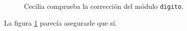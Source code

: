 \begin{figure}[ht]
  \renewcommand{\thesubfigure}{}%
  \centering
  \hfill
  \hfill
  \caption{Cecilia comprueba la corrección del módulo
    \lstinline!digito!.}%
  \label{fig:nueve-ocho-siete}
\end{figure}

La figura \ref{fig:nueve-ocho-siete} parecía asegurarle que sí.

  






